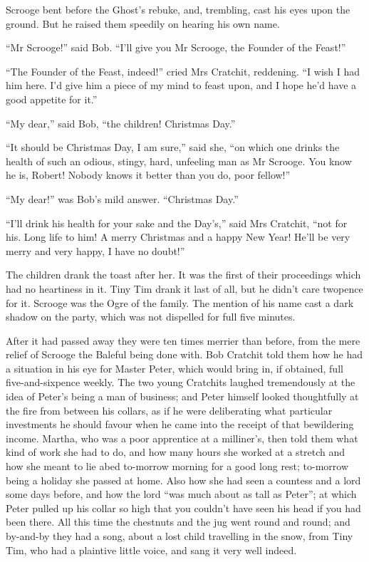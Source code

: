 \documentclass[paper=5.5in:8.5in,BCOR=10mm,twoside,DIV=15,12pt,usegeometry,openany]{scrbook} %
\begin{document}
Scrooge bent before the Ghost's rebuke, and, trembling, cast his eyes upon the ground. But he raised them speedily on hearing his own name.

\enquote{Mr Scrooge!} said Bob. \enquote{I'll give you Mr Scrooge, the Founder of the Feast!}

\enquote{The Founder of the Feast, indeed!} cried Mrs Cratchit, reddening. \enquote{I wish I had him here. I'd give him a piece of my mind to feast upon, and I hope he'd have a good appetite for it.}

\enquote{My dear,} said Bob, \enquote{the children! Christmas Day.}

\enquote{It should be Christmas Day, I am sure,} said she, \enquote{on which one drinks the health of such an odious, stingy, hard, unfeeling man as Mr Scrooge. You know he is, Robert! Nobody knows it better than you do, poor fellow!}

\enquote{My dear!} was Bob's mild answer. \enquote{Christmas Day.}

\enquote{I'll drink his health for your sake and the Day's,} said Mrs Cratchit, \enquote{not for his. Long life to him! A merry Christmas and a happy New Year! He'll be very merry and very happy, I have no doubt!}

The children drank the toast after her. It was the first of their proceedings which had no heartiness in it. Tiny Tim drank it last of all, but he didn't care twopence for it. Scrooge was the Ogre of the family. The mention of his name cast a dark shadow on the party, which was not dispelled for full five minutes.

After it had passed away they were ten times merrier than before, from the mere relief of Scrooge the Baleful being done with. Bob Cratchit told them how he had a situation in his eye for Master Peter, which would bring in, if obtained, full five-and-sixpence weekly. The two young Cratchits laughed tremendously at the idea of Peter's being a man of business; and Peter himself looked thoughtfully at the fire from between his collars, as if he were deliberating what particular investments he should favour when he came into the receipt of that bewildering income. Martha, who was a poor apprentice at a milliner's, then told them what kind of work she had to do, and how many hours she worked at a stretch and how she meant to lie abed to-morrow morning for a good long rest; to-morrow being a holiday she passed at home. Also how she had seen a countess and a lord some days before, and how the lord \enquote{was much about as tall as Peter}; at which Peter pulled up his collar so high that you couldn't have seen his head if you had been there. All this time the chestnuts and the jug went round and round; and by-and-by they had a song, about a lost child travelling in the snow, from Tiny Tim, who had a plaintive little voice, and sang it very well indeed.
\end{document}

